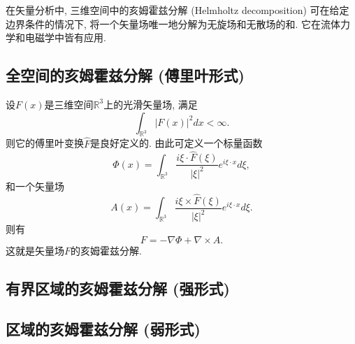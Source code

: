 
在矢量分析中, 三维空间中的亥姆霍兹分解 (Helmholtz decomposition) 可在给定边界条件的情况下, 将一个矢量场唯一地分解为无旋场和无散场的和. 它在流体力学和电磁学中皆有应用.

\subsection{全空间的亥姆霍兹分解 (傅里叶形式)}
设$F(x)$是三维空间$\mathbb{R}^3$上的光滑矢量场, 满足
$$
\int_{\mathbb{R}^3}|F(x)|^2dx<\infty.
$$
则它的傅里叶变换$\hat F$是良好定义的. 由此可定义一个标量函数
$$
\Phi(x)=\int_{\mathbb{R}^3}\frac{i\xi\cdot\hat F(\xi)}{|\xi|^2}e^{i\xi\cdot x}d\xi,
$$
和一个矢量场
$$
A(x)=\int_{\mathbb{R}^3}\frac{i\xi\times\hat F(\xi)}{|\xi|^2}e^{i\xi\cdot x}d\xi.
$$
则有
$$
F=-\nabla\Phi+\nabla\times A.
$$
这就是矢量场$F$的亥姆霍兹分解.

\subsection{有界区域的亥姆霍兹分解 (强形式)}

\subsection{区域的亥姆霍兹分解 (弱形式)}


